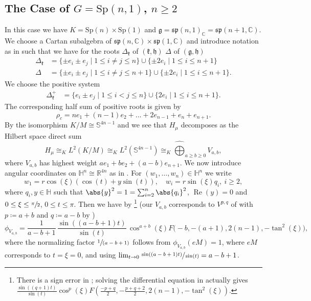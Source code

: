 \documentclass[JEP,XML,SOM,NoFloatCountersInSection,Unicode,published]{cedram}
\newcommand{\spfrac}[2]{\sfrac{#1}{(#2)}}
\theoremstyle{definition}
\DeclarePairedDelimiter{\abs}\lvert\rvert
\newcommand{\mb}[1]{\ensuremath{\mathbb{#1}}}
\newcommand{\mf}[1]{\ensuremath{\mathfrak{#1}}}
\newcommand{\on}[1]{\ensuremath{\operatorname{#1}}}
\newcommand{\rhoc}{\ensuremath{\rho_c}}
\newcommand{\C}{\ensuremath{\mathbb{C}}}
\newcommand{\bbH}{\ensuremath{\mathbb{H}}}
\newcommand{\pst}[1]{\ensuremath{H_{#1}}}
\newcommand{\GSp}[1]{\ensuremath{\mathrm{Sp}(#1,1)}}
\begin{document}
\subsection{\texorpdfstring{The Case of $G=\GSp{n}$, $n\geq 2$}{The Case of G=Sp(n,1), n>=2}}
In this case we have $K=\mathrm{Sp}(n)\times\mathrm{Sp}(1)$ and $\mf g=\mf{sp}(n,1)_\C=\mf{sp}(n+1,\C)$. We choose a Cartan subalgebra of $\mf{sp}(n,\C)\times\mf{sp}(1,\C)$ and introduce notation as in \cite[\S II.2 Ex.\,3]{knapplie} such that we have for the roots $\Delta_{\mf k}$ of $(\mf k,\mf h)$ \resp $\Delta$ of $(\mf g,\mf h)$
\begin{equation}\label{eq:roots_H}
\begin{aligned}
\Delta_{\mf k}&=\{\pm e_i\pm e_j\mid 1\leq i\neq j\leq n\}\cup\{\pm 2e_i\mid 1\leq i\leq n+1\}\\
\Delta&=\{\pm e_i\pm e_j\mid 1\leq i\neq j\leq n+1\}\cup\{\pm 2e_i\mid 1\leq i\leq n+1\}.
\end{aligned}
\end{equation}
We choose the positive system
\begin{align*}
\Delta^+_{\mf k}&=\{e_i\pm e_j\mid 1\leq i<j\leq n\}\cup\{2e_i\mid 1\leq i\leq n+1\}.
\end{align*}
The corresponding half sum of positive roots is given by
\[
\rhoc=ne_1+(n-1)e_2+\ldots+2e_{n-1}+e_n+e_{n+1}.
\]
By the isomorphism $K/M\cong\mb S^{4n-1}$ and \cite[Ch.\,IX.8, Probl.\,12]{knapplie} we see that $\pst{\mu}$ decomposes as the Hilbert space direct sum
\begin{equation}\label{eq:app_KM_sphere_iso_H}
\pst{\mu}\cong_KL^2(K/M)\cong_KL^2(\mb S^{4n-1})\cong_K\widehat\bigoplus_{a\geq b\geq0}V_{a,b},
\end{equation}
where $V_{a,b}$ has highest weight $ae_1+be_2+(a-b)e_{n+1}$. We now introduce angular coordinates on $\bbH^n\cong\mb{R}^{4n}$ as in \cite[Th.\,3.1(4)]{JW}. For $(w_1,\ldots,w_n)\in\bbH^n$ we write
\[
w_1=r\cos(\xi)(\cos(t)+y\sin(t)),\quad w_i=r\sin(\xi)q_i,\ i\geq 2,
\]
where $q_i,y\in\bbH$ such that $\abs{y}^2=1=\sum_{i=2}^n\abs{q_i}^2$, $\on{Re}(y)=0$ and $0\leq\xi\leq\sfrac{\pi}{2}$, $0\leq t\leq\pi$.
Then we have by \cite[Th.\,3.1(4)]{JW}\footnote{There is a sign error in \cite[Th.\,3.1(4)]{JW}; solving the differential equation in \cite[p.\,147]{JW} actually gives
$\frac{\sin((q+1)t)}{\sin(t)}\cos^p(\xi)F\left(\frac{-p+q}{2},-\frac{p+q+2}{2},2(n-1),-\tan^2(\xi)\right)$.} (our $V_{a,b}$ corresponds to $V^{p,q}$ of \cite{JW} with $p\coloneqq a+b$ and $q\coloneqq a-b$ by \cite[Lem.\,3.3]{JW})
\[
\phi_{V_{a,b}}=\frac{1}{a-b+1}\,\frac{\sin((a-b+1)t)}{\sin(t)}\,\cos^{a+b}(\xi)F\bigl(-b,-(a+1),2(n-1),-\tan^2(\xi)\bigr),
\]
where the normalizing factor $\spfrac{1}{a-b+1}$ follows from $\phi_{V_{a,b}}(eM)=1$, where $eM$ corresponds to $t=\xi=0$, and using $\lim_{t\to0}\sfrac{\sin((a-b+1)t)}{\sin(t)}=a-b+1$.
\end{document}
